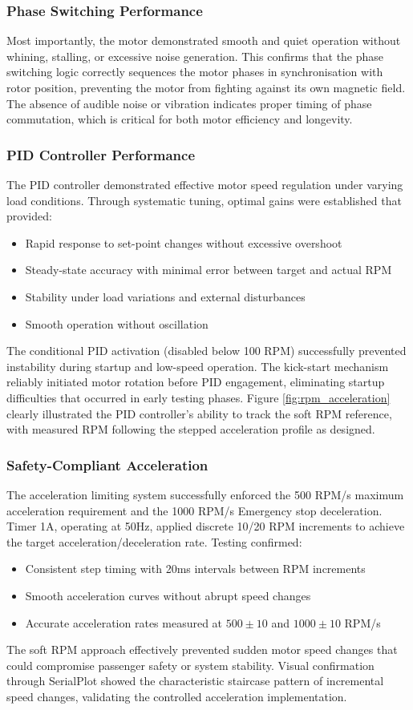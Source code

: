 \documentclass[a4paper, 11pt, titlepage]{article}
\begin{document}
\subsubsection{Phase Switching Performance}
Most importantly, the motor demonstrated smooth and quiet operation without whining, stalling, or excessive noise generation. This confirms that the phase switching logic correctly sequences the motor phases in synchronisation with rotor position, preventing the motor from fighting against its own magnetic field. The absence of audible noise or vibration indicates proper timing of phase commutation, which is critical for both motor efficiency and longevity.
\subsubsection{PID Controller Performance}
The PID controller demonstrated effective motor speed regulation under varying load conditions. Through systematic tuning, optimal gains were established that provided:
\begin{itemize}
    \item Rapid response to set-point changes without excessive overshoot
    \item Steady-state accuracy with minimal error between target and actual RPM
    \item Stability under load variations and external disturbances
    \item Smooth operation without oscillation 
\end{itemize}
The conditional PID activation (disabled below 100 RPM) successfully prevented instability during startup and low-speed operation. The kick-start mechanism reliably initiated motor rotation before PID engagement, eliminating startup difficulties that occurred in early testing phases.
Figure \ref{fig:rpm_acceleration} clearly illustrated the PID controller's ability to track the soft RPM reference, with measured RPM following the stepped acceleration profile as designed.
\subsubsection{Safety-Compliant Acceleration}
The acceleration limiting system successfully enforced the 500 RPM/s maximum acceleration requirement and the 1000 RPM/s Emergency stop deceleration. Timer 1A, operating at 50Hz, applied discrete 10/20 RPM increments to achieve the target acceleration/deceleration rate. Testing confirmed:
\begin{itemize}    
    \item Consistent step timing with 20ms intervals between RPM increments
    \item Smooth acceleration curves without abrupt speed changes
    \item Accurate acceleration rates measured at $500\pm10$ and $1000\pm10$ RPM/s
\end{itemize}
The soft RPM approach effectively prevented sudden motor speed changes that could compromise passenger safety or system stability. Visual confirmation through SerialPlot \parencite{serialplot} showed the characteristic staircase pattern of incremental speed changes, validating the controlled acceleration implementation.
\end{document}
